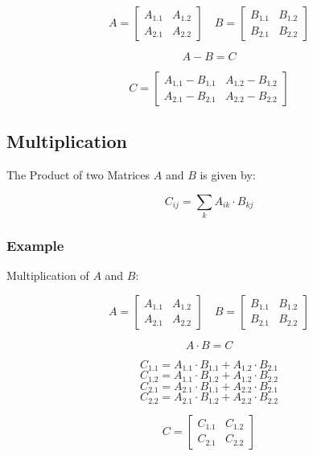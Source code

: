 \documentclass[10pt]{article}
\begin{document}
\[
A = \begin{bmatrix} 
A_{1.1} & A_{1.2} \\   
A_{2.1} & A_{2.2}
\end{bmatrix}  
\quad
B = \begin{bmatrix}
B_{1.1} & B_{1.2} \\
B_{2.1} & B_{2.2}
\end{bmatrix}
\]

\[
A - B = C
\]

\[
C = \begin{bmatrix} 
A_{1.1} - B_{1.1} & A_{1.2} - B_{1.2} \\   
A_{2.1} - B_{2.1} & A_{2.2} - B_{2.2}
\end{bmatrix}
\]


\subsection{Multiplication}
The Product of two Matrices \(A\) and \(B\)  is given by:

\[C_{ij} = \sum_k A_{ik} \cdot B_{kj}\]

\subsubsection{Example}
Multiplication of \(A\) and \(B\):

\[
A = \begin{bmatrix} 
A_{1.1} & A_{1.2} \\   
A_{2.1} & A_{2.2}
\end{bmatrix}  
\quad
B = \begin{bmatrix}
B_{1.1} & B_{1.2} \\
B_{2.1} & B_{2.2}
\end{bmatrix}
\]

\[
A \cdot B = C
\]

\[
C_{1.1} = A_{1.1} \cdot B_{1.1} + A_{1.2} \cdot B_{2.1}
\]
\[
C_{1.2} = A_{1.1} \cdot B_{1.2} + A_{1.2} \cdot B_{2.2} 
\]
\[
C_{2.1} = A_{2.1} \cdot B_{1.1} + A_{2.2} \cdot B_{2.1} 
\]
\[
C_{2.2} = A_{2.1} \cdot B_{1.2} + A_{2.2} \cdot B_{2.2}
\]

\[
C = \begin{bmatrix} 
C_{1.1} & C_{1.2} \\   
C_{2.1} & C_{2.2}
\end{bmatrix}
\]
\end{document}

